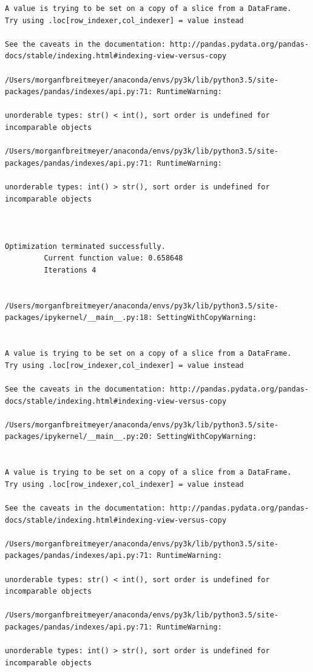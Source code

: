 \begin{lstlisting}
A value is trying to be set on a copy of a slice from a DataFrame.
Try using .loc[row_indexer,col_indexer] = value instead

See the caveats in the documentation: http://pandas.pydata.org/pandas-docs/stable/indexing.html#indexing-view-versus-copy

/Users/morganfbreitmeyer/anaconda/envs/py3k/lib/python3.5/site-packages/pandas/indexes/api.py:71: RuntimeWarning:

unorderable types: str() < int(), sort order is undefined for incomparable objects

/Users/morganfbreitmeyer/anaconda/envs/py3k/lib/python3.5/site-packages/pandas/indexes/api.py:71: RuntimeWarning:

unorderable types: int() > str(), sort order is undefined for incomparable objects



Optimization terminated successfully.
         Current function value: 0.658648
         Iterations 4


/Users/morganfbreitmeyer/anaconda/envs/py3k/lib/python3.5/site-packages/ipykernel/__main__.py:18: SettingWithCopyWarning:


A value is trying to be set on a copy of a slice from a DataFrame.
Try using .loc[row_indexer,col_indexer] = value instead

See the caveats in the documentation: http://pandas.pydata.org/pandas-docs/stable/indexing.html#indexing-view-versus-copy

/Users/morganfbreitmeyer/anaconda/envs/py3k/lib/python3.5/site-packages/ipykernel/__main__.py:20: SettingWithCopyWarning:


A value is trying to be set on a copy of a slice from a DataFrame.
Try using .loc[row_indexer,col_indexer] = value instead

See the caveats in the documentation: http://pandas.pydata.org/pandas-docs/stable/indexing.html#indexing-view-versus-copy

/Users/morganfbreitmeyer/anaconda/envs/py3k/lib/python3.5/site-packages/pandas/indexes/api.py:71: RuntimeWarning:

unorderable types: str() < int(), sort order is undefined for incomparable objects

/Users/morganfbreitmeyer/anaconda/envs/py3k/lib/python3.5/site-packages/pandas/indexes/api.py:71: RuntimeWarning:

unorderable types: int() > str(), sort order is undefined for incomparable objects




\end{lstlisting}
